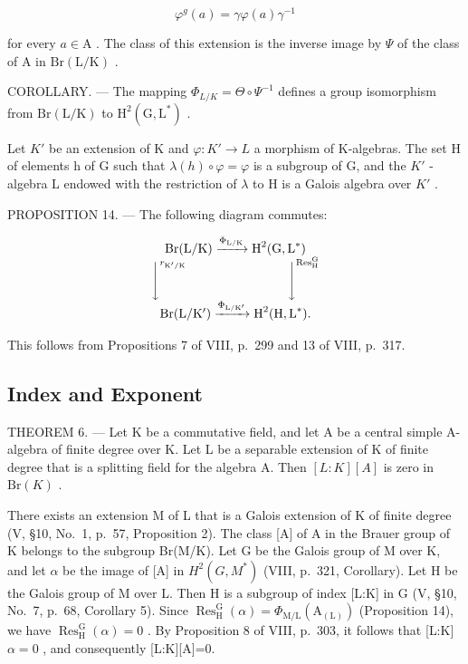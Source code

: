 \[
\varphi^ {g} (a) = \gamma \varphi (a) \gamma^ {- 1}
\]

for every \(a \in \mathrm{A}\) . The class of this extension is the inverse image by \(\Psi\) of the class of \(\mathrm{A}\) in \(\mathrm{Br}(\mathrm{L} / \mathrm{K})\) .

COROLLARY. --- The mapping \(\Phi_{L/K} = \Theta \circ \Psi^{-1}\) defines a group isomorphism from \(\mathrm{Br}(\mathrm{L}/\mathrm{K})\) to \(\mathrm{H}^{2}(\mathrm{G}, \mathrm{L}^{*})\) .

Let \(K'\) be an extension of K and \(\varphi: K' \to L\) a morphism of K-algebras. The set H of elements h of G such that \(\lambda(h) \circ \varphi = \varphi\) is a subgroup of G, and the \(K'\) -algebra L endowed with the restriction of \(\lambda\) to H is a Galois algebra over \(K'\) .

PROPOSITION 14. --- The following diagram commutes:

\[
\begin{array}{c} \operatorname{Br} (\mathrm{L} / \mathrm{K}) \xrightarrow {\Phi_ {\mathrm{L} / \mathrm{K}}} \operatorname{H} ^ {2} (\operatorname{G}, \operatorname{L} ^ {*}) \\ \Biggl \downarrow^ {r _ {\mathrm{K} ^ {\prime} / \mathrm{K}}} \qquad \qquad \qquad \qquad \Biggl \downarrow^ {\operatorname{Res} _ {\mathrm{H}} ^ {\mathrm{G}}} \\ \operatorname{Br} (\mathrm{L} / \mathrm{K} ^ {\prime}) \xrightarrow {\Phi_ {\mathrm{L} / \mathrm{K} ^ {\prime}}} \operatorname{H} ^ {2} (\operatorname{H}, \operatorname{L} ^ {*})  . \end{array}
\]

This follows from Propositions 7 of VIII, p.~299 and 13 of VIII, p.~317.

\subsection{Index and Exponent}

THEOREM 6. --- Let K be a commutative field, and let A be a central simple A-algebra of finite degree over K. Let L be a separable extension of K of finite degree that is a splitting field for the algebra A. Then \([L:K][A]\) is zero in \(\mathrm{Br}(K)\) .

There exists an extension M of L that is a Galois extension of K of finite degree (V, §10, No.~1, p.~57, Proposition 2). The class {[}A{]} of A in the Brauer group of K belongs to the subgroup Br(M/K). Let G be the Galois group of M over K, and let \(\alpha\) be the image of {[}A{]} in \(H^{2}(G,M^{*})\) (VIII, p.~321, Corollary). Let H be the Galois group of M over L. Then H is a subgroup of index {[}L:K{]} in G (V, §10, No.~7, p.~68, Corollary 5). Since \(\operatorname{Res}_{\mathrm{H}}^{\mathrm{G}}(\alpha)=\Phi_{\mathrm{M/L}}(\mathrm{A}_{(\mathrm{L})})\) (Proposition 14), we have \(\operatorname{Res}_{\mathrm{H}}^{\mathrm{G}}(\alpha)=0\) . By Proposition 8 of VIII, p.~303, it follows that {[}L:K{]} \(\alpha=0\) , and consequently {[}L:K{]}{[}A{]}=0.

